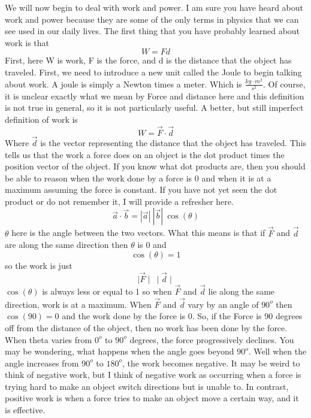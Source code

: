 We will now begin to deal with work and power. I am sure you have heard about work and power because they are some of the only terms in physics that we can see used in our daily lives. The first thing that you have probably learned about work is that \begin{equation}W=Fd\end{equation} First, here W is work, F is the force, and d is the distance that the object has traveled. First, we need to introduce a new unit called the Joule to begin talking about work. A joule is simply a Newton times a meter. Which is $\frac{kg\cdot m^2}{s^2}$. Of course, it is unclear exactly what we mean by Force and distance here and this definition is not true in general, so it is not particularly useful. A better, but still imperfect definition of work is \begin{equation}W=\vec{F} \cdot \vec{d}\end{equation} Where $\vec{d}$ is the vector representing the distance that the object has traveled. This tells us that the work a force does on an object is the dot product times the position vector of the object. If you know what dot products are, then you should be able to reason when the work done by a force is 0 and when it is at a maximum assuming the force is constant. If you have not yet seen the dot product or do not remember it, I will provide a refresher here. $$\vec{a} \cdot \vec{b}=|\vec{a}| \ |\vec{b}| \ \cos\left(\theta \right)$$ $\theta$ here is the angle between the two vectors. What this means is that if $\vec{F}$ and $\vec{d}$ are along the same direction then $\theta$ is 0 and $$\cos\left(\theta \right)=1$$ so the work is just $$\mid \vec{F}\mid \ \mid\vec{d}\mid$$ $\cos\left(\theta \right)$ is always less or equal to 1 so when $\vec{F}$ and $\vec{d}$ lie along the same direction, work is at a maximum. When $\vec{F}$ and $\vec{d}$ vary by an angle of $90^o$ then $\cos\left(90 \right)=0$ and the work done by the force is 0. So, if the Force is 90 degrees off from the distance of the object, then no work has been done by the force. When theta varies from $0^o$ to $90^o$ degrees, the force progressively declines. You may be wondering, what happens when the angle goes beyond $90^o$. Well when the angle increases from $90^o$ to $180^o$, the work becomes negative. It may be weird to think of negative work, but I think of negative work as occurring when a force is trying hard to make an object switch directions but is unable to. In contrast, positive work is when a force tries to make an object move a certain way, and it is effective. 

